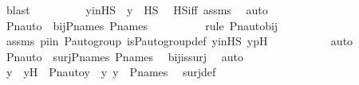 \begin{isabellebody}
\ blast\isanewline
\ \ \ \ \ \ \isamarkupfalse%
\ \isamarkupfalse%
\ yinHS\ {\isacharcolon}{\kern0pt}\ {\isachardoublequoteopen}y\ {\isasymin}\ HS{\isachardoublequoteclose}\ \isamarkupfalse%
\ HS{\isacharunderscore}{\kern0pt}iff\ assms\ \isamarkupfalse%
\ auto\isanewline
\isanewline
\ \ \ \ \ \ \isamarkupfalse%
\ {\isachardoublequoteopen}Pn{\isacharunderscore}{\kern0pt}auto{\isacharparenleft}{\kern0pt}{\isasympi}{\isacharparenright}{\kern0pt}\ {\isasymin}\ bij{\isacharparenleft}{\kern0pt}P{\isacharunderscore}{\kern0pt}names{\isacharcomma}{\kern0pt}\ P{\isacharunderscore}{\kern0pt}names{\isacharparenright}{\kern0pt}{\isachardoublequoteclose}\ \isanewline
\ \ \ \ \ \ \ \ \isamarkupfalse%
{\isacharparenleft}{\kern0pt}rule\ Pn{\isacharunderscore}{\kern0pt}auto{\isacharunderscore}{\kern0pt}bij{\isacharparenright}{\kern0pt}\isanewline
\ \ \ \ \ \ \ \ \isamarkupfalse%
\ assms\ piin{\isasymG}\ {\isasymG}{\isacharunderscore}{\kern0pt}P{\isacharunderscore}{\kern0pt}auto{\isacharunderscore}{\kern0pt}group\ is{\isacharunderscore}{\kern0pt}P{\isacharunderscore}{\kern0pt}auto{\isacharunderscore}{\kern0pt}group{\isacharunderscore}{\kern0pt}def\ yinHS\ ypH\ \isanewline
\ \ \ \ \ \ \ \ \isamarkupfalse%
\ auto\isanewline
\ \ \ \ \ \ \isamarkupfalse%
\ \isamarkupfalse%
\ {\isachardoublequoteopen}Pn{\isacharunderscore}{\kern0pt}auto{\isacharparenleft}{\kern0pt}{\isasympi}{\isacharparenright}{\kern0pt}\ {\isasymin}\ surj{\isacharparenleft}{\kern0pt}P{\isacharunderscore}{\kern0pt}names{\isacharcomma}{\kern0pt}\ P{\isacharunderscore}{\kern0pt}names{\isacharparenright}{\kern0pt}{\isachardoublequoteclose}\ \isamarkupfalse%
\ bij{\isacharunderscore}{\kern0pt}is{\isacharunderscore}{\kern0pt}surj\ \isamarkupfalse%
\ auto\isanewline
\ \ \ \ \ \ \isamarkupfalse%
\ \isamarkupfalse%
\ y{\isacharprime}{\kern0pt}\ \ y{\isacharprime}{\kern0pt}H\ {\isacharcolon}{\kern0pt}\ {\isachardoublequoteopen}Pn{\isacharunderscore}{\kern0pt}auto{\isacharparenleft}{\kern0pt}{\isasympi}{\isacharparenright}{\kern0pt}{\isacharbackquote}{\kern0pt}y{\isacharprime}{\kern0pt}\ {\isacharequal}{\kern0pt}\ y{\isachardoublequoteclose}\ {\isachardoublequoteopen}y{\isacharprime}{\kern0pt}\ {\isasymin}\ P{\isacharunderscore}{\kern0pt}names{\isachardoublequoteclose}\ \isamarkupfalse%
\ surj{\isacharunderscore}{\kern0pt}def\ \isamarkupfalse%

\end{isabellebody}
